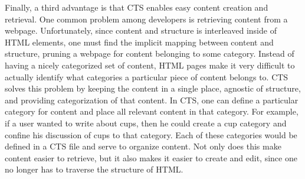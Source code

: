 \documentclass[12pt]{article}
\begin{document}
Finally, a third advantage is that CTS enables easy content creation and retrieval. One common problem among developers is retrieving content from a webpage. Unfortunately, since content and structure is interleaved inside of HTML elements, one must find the implicit mapping between content and structure, pruning a webpage for content belonging to some category. Instead of having a nicely categorized set of content, HTML pages make it very difficult to actually identify what categories a particular piece of content belongs to. CTS solves this problem by keeping the content in a single place, agnostic of structure, and providing categorization of that content. In CTS, one can define a particular category for content and place all relevant content in that category. For example, if a user wanted to write about cups, then he could create a cup category and confine his discussion of cups to that category. Each of these categories would be defined in a CTS file and serve to organize content. Not only does this make content easier to retrieve, but it also makes it easier to create and edit, since one no longer has to traverse the structure of HTML.
\end{document}
